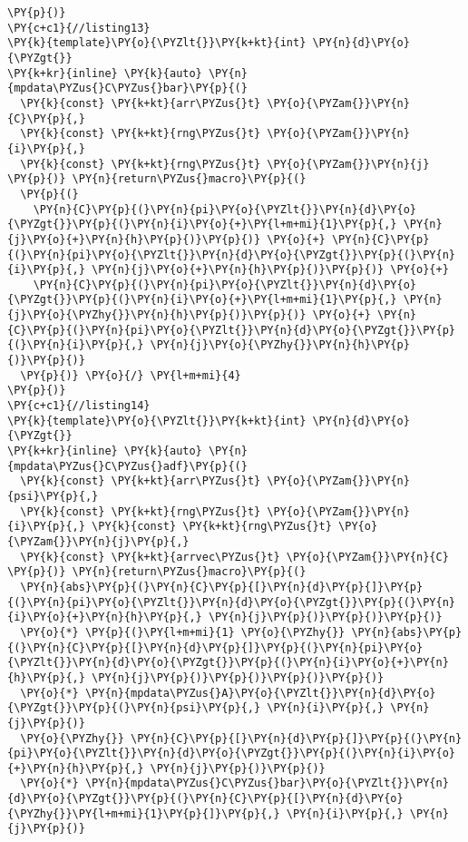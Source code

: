 \begin{Verbatim}[commandchars=\\\{\}]
\PY{p}{)}
\PY{c+c1}{//listing13}
\PY{k}{template}\PY{o}{\PYZlt{}}\PY{k+kt}{int} \PY{n}{d}\PY{o}{\PYZgt{}}
\PY{k+kr}{inline} \PY{k}{auto} \PY{n}{mpdata\PYZus{}C\PYZus{}bar}\PY{p}{(}
  \PY{k}{const} \PY{k+kt}{arr\PYZus{}t} \PY{o}{\PYZam{}}\PY{n}{C}\PY{p}{,} 
  \PY{k}{const} \PY{k+kt}{rng\PYZus{}t} \PY{o}{\PYZam{}}\PY{n}{i}\PY{p}{,} 
  \PY{k}{const} \PY{k+kt}{rng\PYZus{}t} \PY{o}{\PYZam{}}\PY{n}{j}
\PY{p}{)} \PY{n}{return\PYZus{}macro}\PY{p}{(}
  \PY{p}{(}
    \PY{n}{C}\PY{p}{(}\PY{n}{pi}\PY{o}{\PYZlt{}}\PY{n}{d}\PY{o}{\PYZgt{}}\PY{p}{(}\PY{n}{i}\PY{o}{+}\PY{l+m+mi}{1}\PY{p}{,} \PY{n}{j}\PY{o}{+}\PY{n}{h}\PY{p}{)}\PY{p}{)} \PY{o}{+} \PY{n}{C}\PY{p}{(}\PY{n}{pi}\PY{o}{\PYZlt{}}\PY{n}{d}\PY{o}{\PYZgt{}}\PY{p}{(}\PY{n}{i}\PY{p}{,} \PY{n}{j}\PY{o}{+}\PY{n}{h}\PY{p}{)}\PY{p}{)} \PY{o}{+}
    \PY{n}{C}\PY{p}{(}\PY{n}{pi}\PY{o}{\PYZlt{}}\PY{n}{d}\PY{o}{\PYZgt{}}\PY{p}{(}\PY{n}{i}\PY{o}{+}\PY{l+m+mi}{1}\PY{p}{,} \PY{n}{j}\PY{o}{\PYZhy{}}\PY{n}{h}\PY{p}{)}\PY{p}{)} \PY{o}{+} \PY{n}{C}\PY{p}{(}\PY{n}{pi}\PY{o}{\PYZlt{}}\PY{n}{d}\PY{o}{\PYZgt{}}\PY{p}{(}\PY{n}{i}\PY{p}{,} \PY{n}{j}\PY{o}{\PYZhy{}}\PY{n}{h}\PY{p}{)}\PY{p}{)} 
  \PY{p}{)} \PY{o}{/} \PY{l+m+mi}{4}
\PY{p}{)}
\PY{c+c1}{//listing14}
\PY{k}{template}\PY{o}{\PYZlt{}}\PY{k+kt}{int} \PY{n}{d}\PY{o}{\PYZgt{}}
\PY{k+kr}{inline} \PY{k}{auto} \PY{n}{mpdata\PYZus{}C\PYZus{}adf}\PY{p}{(}
  \PY{k}{const} \PY{k+kt}{arr\PYZus{}t} \PY{o}{\PYZam{}}\PY{n}{psi}\PY{p}{,} 
  \PY{k}{const} \PY{k+kt}{rng\PYZus{}t} \PY{o}{\PYZam{}}\PY{n}{i}\PY{p}{,} \PY{k}{const} \PY{k+kt}{rng\PYZus{}t} \PY{o}{\PYZam{}}\PY{n}{j}\PY{p}{,}
  \PY{k}{const} \PY{k+kt}{arrvec\PYZus{}t} \PY{o}{\PYZam{}}\PY{n}{C}
\PY{p}{)} \PY{n}{return\PYZus{}macro}\PY{p}{(}
  \PY{n}{abs}\PY{p}{(}\PY{n}{C}\PY{p}{[}\PY{n}{d}\PY{p}{]}\PY{p}{(}\PY{n}{pi}\PY{o}{\PYZlt{}}\PY{n}{d}\PY{o}{\PYZgt{}}\PY{p}{(}\PY{n}{i}\PY{o}{+}\PY{n}{h}\PY{p}{,} \PY{n}{j}\PY{p}{)}\PY{p}{)}\PY{p}{)} 
  \PY{o}{*} \PY{p}{(}\PY{l+m+mi}{1} \PY{o}{\PYZhy{}} \PY{n}{abs}\PY{p}{(}\PY{n}{C}\PY{p}{[}\PY{n}{d}\PY{p}{]}\PY{p}{(}\PY{n}{pi}\PY{o}{\PYZlt{}}\PY{n}{d}\PY{o}{\PYZgt{}}\PY{p}{(}\PY{n}{i}\PY{o}{+}\PY{n}{h}\PY{p}{,} \PY{n}{j}\PY{p}{)}\PY{p}{)}\PY{p}{)}\PY{p}{)} 
  \PY{o}{*} \PY{n}{mpdata\PYZus{}A}\PY{o}{\PYZlt{}}\PY{n}{d}\PY{o}{\PYZgt{}}\PY{p}{(}\PY{n}{psi}\PY{p}{,} \PY{n}{i}\PY{p}{,} \PY{n}{j}\PY{p}{)} 
  \PY{o}{\PYZhy{}} \PY{n}{C}\PY{p}{[}\PY{n}{d}\PY{p}{]}\PY{p}{(}\PY{n}{pi}\PY{o}{\PYZlt{}}\PY{n}{d}\PY{o}{\PYZgt{}}\PY{p}{(}\PY{n}{i}\PY{o}{+}\PY{n}{h}\PY{p}{,} \PY{n}{j}\PY{p}{)}\PY{p}{)} 
  \PY{o}{*} \PY{n}{mpdata\PYZus{}C\PYZus{}bar}\PY{o}{\PYZlt{}}\PY{n}{d}\PY{o}{\PYZgt{}}\PY{p}{(}\PY{n}{C}\PY{p}{[}\PY{n}{d}\PY{o}{\PYZhy{}}\PY{l+m+mi}{1}\PY{p}{]}\PY{p}{,} \PY{n}{i}\PY{p}{,} \PY{n}{j}\PY{p}{)}

\end{Verbatim}
